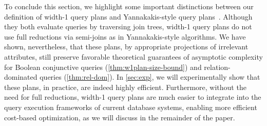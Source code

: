 To conclude this section, we highlight some important distinctions between our definition of width-1 query plans and Yannakakis-style query plans~\cite{yannakakis_algorithms_1981,wang_yannakakis_2025}. Although they both evaluate queries by traversing join trees, width-1 query plans do not use full reductions via semi-joins as in Yannakakis-style algorithms. We have shown, nevertheless, that these plans, by appropriate projections of irrelevant attributes, still preserve favorable theoretical guarantees of asymptotic complexity for Boolean conjunctive queries (\cref{thm:w1plan-size-bound}) and relation-dominated queries (\cref{thm:rel-dom}). In \cref{sec:exp}, we will experimentally show that these plans, in practice, are indeed highly efficient. Furthermore, without the need for full reductions, width-1 query plans are much easier to integrate into the query execution frameworks of current database systems, enabling more efficient cost-based optimization, as we will discuss in the remainder of the paper.
